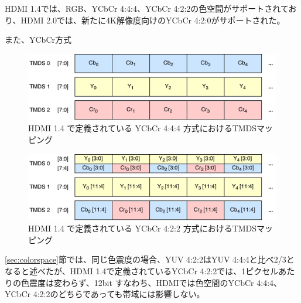 HDMI 1.4\cite{hdmi-spec-1-4}では、RGB、YCbCr 4:4:4、YCbCr 4:2:2の色空間がサポートされており、HDMI 2.0\cite{hdmi-spec-2-0}では、新たに4K解像度向けのYCbCr 4:2:0がサポートされた。

また、YCbCr方式

\begin{figure}[htbp]
    \begin{center}
        \includegraphics[bb=0 0 531 141,width=13.926cm]{img/hdmi-spec-yuv-444.pdf}
    \end{center}
    \caption{HDMI 1.4 で定義されている YCbCr 4:4:4 方式におけるTMDSマッピング}
    \label{fig:hdmi-spec-yuv-444}
\end{figure}

\begin{figure}[htbp]
    \begin{center}
        \includegraphics[bb=0 0 531 141,width=13.926cm]{img/hdmi-spec-yuv-422.pdf}
    \end{center}
    \caption{HDMI 1.4 で定義されている YCbCr 4:2:2 方式におけるTMDSマッピング}
    \label{fig:hdmi-spec-yuv-422}
\end{figure}

\ref{sec:colorspace}節では、同じ色震度の場合、YUV 4:2:2はYUV 4:4:4と比べ2/3となると述べたが、HDMI 1.4で定義されているYCbCr 4:2:2では、1ピクセルあたりの色震度は変わらず、12bit
すなわち、HDMIでは色空間のYCbCr 4:4:4、YCbCr 4:2:2のどちらであっても帯域には影響しない。

